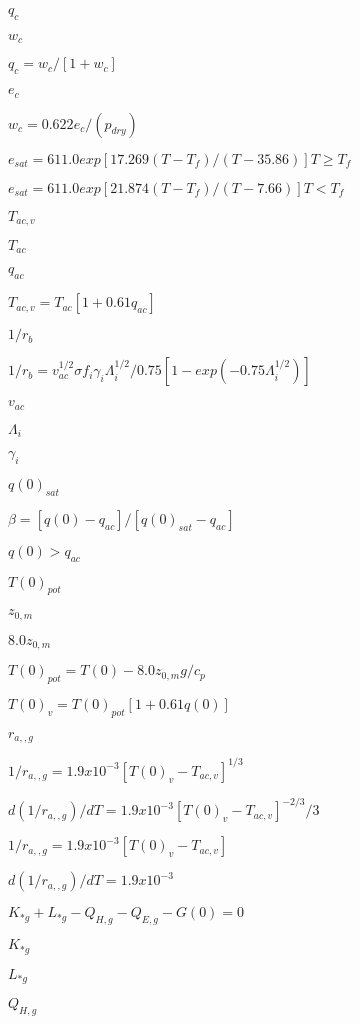 \documentclass{article}
\begin{document}
{$q_c$
\pagebreak

$w_c$
\pagebreak

$q_c = w_c /[1 + w_c ]$
\pagebreak

$e_c$
\pagebreak

$w_c = 0.622 e_c /(p_{dry} )$
\pagebreak

$e_{sat} = 611.0 exp[17.269(T - T_f )/(T - 35.86)] T \geq T_f$
\pagebreak

$e_{sat} = 611.0 exp[21.874(T - T_f )/(T - 7.66)] T < T_f$
\pagebreak

$T_{ac,v}$
\pagebreak

$T_{ac}$
\pagebreak

$q_{ac}$
\pagebreak

$T_{ac,v} = T_{ac} [1 + 0.61 q_{ac} ]$
\pagebreak

$1/r_b$
\pagebreak

$1/r_b = v_{ac}^{1/2} \sigma f_i \gamma_i \Lambda_i^{1/2} /0.75 [1 - exp(-0.75 \Lambda_i^{1/2})]$
\pagebreak

$v_{ac}$
\pagebreak

$\Lambda_i$
\pagebreak

$\gamma_i$
\pagebreak

$q(0)_{sat}$
\pagebreak

$\beta = [q(0) - q_{ac} ]/[q(0)_{sat} - q_{ac} ]$
\pagebreak

$q(0) > q_{ac}$
\pagebreak

$T(0)_{pot}$
\pagebreak

$z_{0,m}$
\pagebreak

$8.0 z_{0,m}$
\pagebreak

$T(0)_{pot} = T(0) - 8.0 z_{0,m} g/c_p$
\pagebreak

$T(0)_v = T(0)_{pot} [1 + 0.61 q(0)]$
\pagebreak

$r_{a,,g}$
\pagebreak

$1/r_{a,,g} = 1.9 x 10^{-3} [T(0)_v - T_{ac,v} ]^{1/3}$
\pagebreak

$d(1/r_{a,,g} )/dT = 1.9 x 10^{-3} [T(0)_v - T_{ac,v} ]^{-2/3} /3$
\pagebreak

$1/r_{a,,g} = 1.9 x 10^{-3} [T(0)_v - T_{ac,v} ]$
\pagebreak

$d(1/r_{a,,g} )/dT = 1.9 x 10^{-3}$
\pagebreak

$K_{*g} + L_{*g} - Q_{H,g} - Q_{E,g} - G(0) = 0$
\pagebreak

$K_{*g}$
\pagebreak

$L_{*g}$
\pagebreak

$Q_{H,g}$
\pagebreak

}
\end{document}
